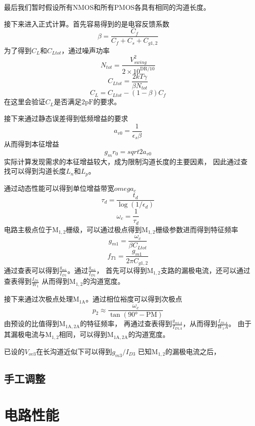 \documentclass[a4paper]{article}
\newcommand{\upF}{\si{\pico\farad}}
\newcommand{\udeg}{\si{\degree}}
\newcommand{\dM}[1]{\mathrm{M}_\mathrm{#1}}
\newcommand{\DM}[1]{$\dM{#1}$}
\begin{document}
最后我们暂时假设所有NMOS和所有PMOS各具有相同的沟道长度。

接下来进入正式计算。首先容易得到的是电容反馈系数
$$\beta=\frac{C_f}{C_f+C_s+C_{g1,2}}$$
为了得到$C_L$和$C_{Ltot}$，通过噪声功率
$$N_{tot}=\frac{V_{swing}^2}{2\times10^{\mathrm{DR}/10}}$$
$$C_{Ltot}=\frac{2kT\gamma}{\beta N_{tot}}$$
$$C_L=C_{Ltot}-(1-\beta)C_f$$
在这里会验证$C_L$是否满足$2\upF$的要求。

接下来通过静态误差得到低频增益的要求
$$a_{v0}=\frac{1}{\epsilon_s\beta}$$
从而得到本征增益
$$g_mr_0=sqrt{2a_{v0}}$$
实际计算发现需求的本征增益较大，成为限制沟道长度的主要因素，
因此通过查找可以得到沟道长度$L_n$和$L_p$。

通过动态性能可以得到单位增益带宽$omega_c$
$$\tau_d=\frac{t_d}{\log(1/\epsilon_d)}$$
$$\omega_c=\frac{1}{\tau_d}$$
电路主极点位于\DM{1,2}栅级，可以通过极点得到\DM{1,2}栅级参数进而得到特征频率
$$g_{m1}=\frac{\omega_c}{\beta C_{Ltot}}$$
$$f_{T1}=\frac{g_{m1}}{2\pi C_{g1,2}}$$
通过查表可以得到$\frac{g_{m1}}{I_{D1}}$。通过$\frac{g_{m1}}{I_{D1}}$，
首先可以得到\DM{1,2}支路的漏极电流，还可以通过查表得到$\frac{I_{D1}}{W_1}$
从而得到\DM{1,2}的沟道宽度。

接下来通过次极点处理\DM{1A}。通过相位裕度可以得到次极点
$$p_2\approx\frac{\omega_c}{\tan(90\udeg-\mathrm{PM})}$$
由预设的比值得到\DM{1A,2A}的特征频率，
再通过查表得到$\frac{g_{m1A}}{I_{D1A}}$，从而得到$\frac{I_{D1A}}{W_1A}$。
由于其漏极电流与\DM{1,2}相同，可以得到\DM{1A,2A}的沟道宽度。

已设的$V_{ov3}$在长沟道近似下可以得到$g_{m3}/I_{D3}$
已知\DM{1,2}的漏极电流之后，


\subsection{手工调整}

\newpage

\section{电路性能}
\end{document}
